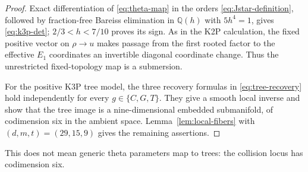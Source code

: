 \documentclass[11pt]{article}
\theoremstyle{remark}\newtheorem{remark}[theorem]{Remark}
\begin{document}
\begin{proof}
Exact differentiation of \eqref{eq:theta-map} in the orders \eqref{eq:Jstar-definition}, followed by fraction-free Bareiss elimination in $\mathbb Q(h)$ with $5h^4=1$, gives \eqref{eq:k3p-det}; $2/3<h<7/10$ proves its sign. As in the K2P calculation, the fixed positive vector on $\rho\to u$ makes passage from the first rooted factor to the effective $E_1$ coordinates an invertible diagonal coordinate change. Thus the unrestricted fixed-topology map is a submersion.

For the positive K3P tree model, the three recovery formulas in \eqref{eq:tree-recovery} hold independently for every $g\in\{C,G,T\}$. They give a smooth local inverse and show that the tree image is a nine-dimensional embedded submanifold, of codimension six in the ambient space. Lemma~\ref{lem:local-fibers} with $(d,m,t)=(29,15,9)$ gives the remaining assertions.
\end{proof}
This does not mean generic theta parameters map to trees: the collision locus has codimension six.
\end{document}
